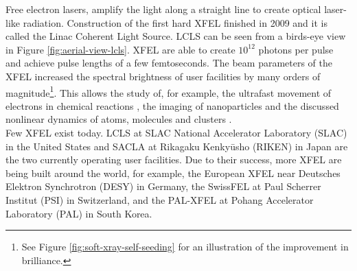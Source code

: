 %
Free electron lasers, amplify the light along a straight line to create optical laser-like radiation. Construction of the first hard XFEL finished in 2009 and it is called the Linac Coherent Light Source. LCLS can be seen from a birds-eye view in Figure \ref{fig:aerial-view-lcls}. XFEL are able to create $10^{12}$ photons per pulse and achieve pulse lengths of a few femtoseconds. The beam parameters of the XFEL increased the spectral brightness of user facilities by many orders of magnitude\footnote{See Figure \ref{fig:soft-xray-self-seeding} for an illustration of the improvement in brilliance.}. This allows the study of, for example, the ultrafast movement of electrons in chemical reactions \citep{Dell'Angela-2013-Science,Picon-2016-NatComm}, the imaging of nanoparticles \citep{Chapman-2011-Nature,Seibert-2011-Nature} and the discussed nonlinear dynamics of atoms, molecules and clusters \citep{Young-2010-Nature,Rohringer-2012-Nature,Berrah-2011-PNAS,Gorkhover-2012-PRL}.\\[1\baselineskip]
%
Few XFEL exist today. LCLS at SLAC National Accelerator Laboratory (SLAC) in the United States and SACLA at Rikagaku Kenkyūsho (RIKEN) in Japan are the two currently operating user facilities. Due to their success, more XFEL are being built around the world, for example, the European XFEL near Deutsches Elektron Synchrotron (DESY) in Germany, the SwissFEL at Paul Scherrer Institut (PSI) in Switzerland, and the PAL-XFEL at Pohang Accelerator Laboratory (PAL) in South Korea.
%
%
%
